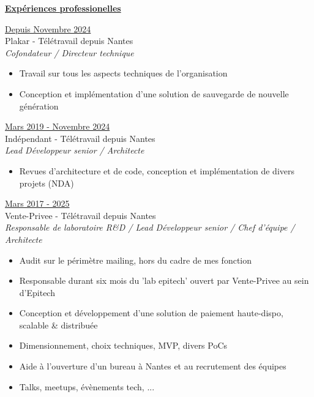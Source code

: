 \documentclass[a4paper,10pt]{letter}
\begin{document}
\underline{\textbf{Exp\'eriences professionelles}}\\
\begin{description}

  \item{\underline{Depuis Novembre 2024}}\\
  Plakar - T\'el\'etravail depuis Nantes\\
  \textit{Cofondateur / Directeur technique}
  \begin{itemize}
    \item Travail sur tous les aspects techniques de l'organisation
    \item Conception et impl\'ementation d'une solution de sauvegarde de nouvelle g\'en\'eration\\
  \end{itemize}

\item{\underline{Mars 2019 - Novembre 2024}}\\
  Ind\'ependant - T\'el\'etravail depuis Nantes\\
  \textit{Lead D\'eveloppeur senior / Architecte}
  \begin{itemize}
    \item Revues d'architecture et de code, conception et impl\'ementation de divers projets (NDA)\\
  \end{itemize}

\item{\underline{Mars 2017 - 2025}}\\
  Vente-Privee - T\'el\'etravail depuis Nantes\\
  \textit{Responsable de laboratoire R\&D / Lead D\'eveloppeur senior / Chef d'\'equipe / Architecte}
  \begin{itemize}
  \item Audit sur le p\'erim\`etre mailing, hors du cadre de mes fonction
  \item Responsable durant six mois du 'lab epitech' ouvert par Vente-Privee au sein d'Epitech
  \item Conception et d\'eveloppement d'une solution de paiement haute-dispo, scalable \& distribu\'ee
  \item Dimensionnement, choix techniques, MVP, divers PoCs
  \item Aide \`a l'ouverture d'un bureau \`a Nantes et au recrutement des \'equipes
  \item Talks, meetups, \'ev\`enements tech, ...\\
  \end{itemize}


\end{description}
\end{document}
